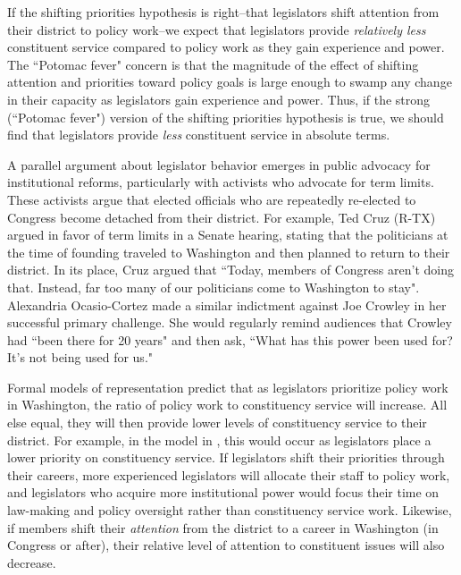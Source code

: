 \documentclass[12pt]{article}
\begin{document}
If the shifting priorities hypothesis is right--that legislators shift attention from their district to policy work--we expect that legislators provide \textit{relatively less} constituent service compared to policy work as they gain experience and power. The ``Potomac fever" concern is that the magnitude of the effect of shifting attention and priorities toward policy goals is large enough to swamp any change in their capacity as legislators gain experience and power. Thus, if the strong (``Potomac fever") version of the shifting priorities hypothesis is true, we should find that legislators provide \textit{less} constituent service in absolute terms. 


A parallel argument about legislator behavior emerges in public advocacy for institutional reforms, particularly with activists who advocate for term limits. These activists argue that elected officials who are repeatedly re-elected to Congress become detached from their district. For example, Ted Cruz (R-TX) argued in favor of term limits in a Senate hearing, stating that the politicians at the time of founding traveled to Washington and then planned to return to their district. In its place, Cruz argued that ``Today, members of Congress aren't doing that. Instead, far too many of our politicians come to Washington to stay". Alexandria Ocasio-Cortez made a similar indictment against Joe Crowley in her successful primary challenge. She would regularly remind audiences that Crowley had ``been there for 20 years" and then ask, ``What has this power been used for? It's not being used for us." %

Formal models of representation predict that as legislators prioritize policy work in Washington, the ratio of policy work to constituency service will increase. All else equal, they will then provide lower levels of constituency service to their district. For example, in the model in \cite{AshworthBuenodeMesquita2006}, this would occur as legislators place a lower priority on constituency service. If legislators shift their priorities through their careers, more experienced legislators will allocate their staff to policy work, and legislators who acquire more institutional power would focus their time on law-making and policy oversight rather than constituency service work. Likewise, if members shift their \textit{attention} from the district to a career in Washington (in Congress or after), their relative level of attention to constituent issues will also decrease. 
\end{document}
